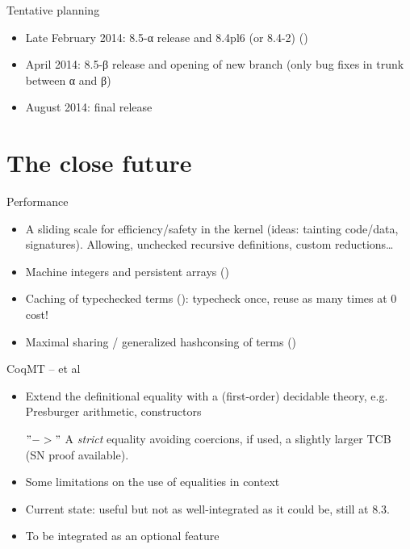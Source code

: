 \begin{subsecframe}{Tentative planning}
  \begin{itemize}
  \item Late February 2014: 8.5-α release and 8.4pl6 (or 8.4-2) ()
  \item April 2014: 8.5-β release and opening of new branch
    (only bug fixes in trunk between α and β)
  \item August 2014: final release
  \end{itemize}
\end{subsecframe}


\section{The close future}

\begin{subsecframe}{Performance}

  \begin{itemize}
  \item A sliding scale for efficiency/safety in the kernel (ideas:
    tainting code/data, signatures). Allowing, unchecked recursive
    definitions, custom reductions\dots
  \item Machine integers and persistent arrays ()
  \item Caching of typechecked terms ():
    typecheck once, reuse as many times at 0 cost!
  \item Maximal sharing / generalized hashconsing of terms ()
  \end{itemize}
  
\end{subsecframe}

\begin{subsecframe}{CoqMT --  et al}
  \begin{itemize}
  \item Extend the definitional equality with a (first-order) decidable
    theory, e.g. Presburger arithmetic, constructors
  \item[$"->"$] A \emph{strict} equality avoiding coercions, 
    if used, a slightly larger TCB (SN proof available).
  \item Some limitations on the use of equalities in context
  \item Current state: useful but not as well-integrated as it could
    be, still at 8.3.
  \item To be integrated as an optional feature
  \end{itemize}
\end{subsecframe}  


